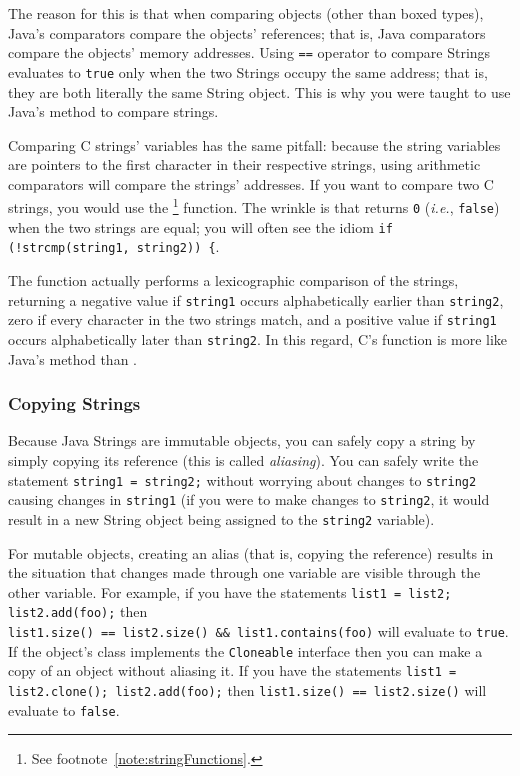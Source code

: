 The reason for this is that when comparing objects (other than boxed types), Java's comparators compare the objects' references;
that is, Java comparators compare the objects' memory addresses.
Using \lstinline{==} operator to compare Strings evaluates to \lstinline{true} only when the two Strings occupy the same address;
that is, they are both literally the same String object.
This is why you were taught to use Java's  method to compare strings.

Comparing C strings' variables has the same pitfall:
because the string variables are pointers to the first character in their respective strings, using arithmetic comparators will compare the strings' addresses.
If you want to compare two C strings, you would use the \footnote{See footnote~\ref{note:stringFunctions}.} function.
The wrinkle is that  returns \lstinline{0} (\textit{i.e.}, \lstinline{false}) when the two strings are equal;
you will often see the idiom \lstinline{if (!strcmp(string1, string2)) {}.

The  function actually performs a lexicographic comparison of the strings, returning a negative value if \lstinline{string1} occurs alphabetically earlier than \lstinline{string2}, zero if every character in the two strings match, and a positive value if \lstinline{string1} occurs alphabetically later than \lstinline{string2}.
In this regard, C's  function is more like Java's  method than .

\subsubsection{Copying Strings}

Because Java Strings are immutable objects, you can safely copy a string by simply copying its reference (this is called \textit{aliasing}).
You can safely write the statement \lstinline{string1 = string2;} without worrying about changes to \lstinline{string2} causing changes in \lstinline{string1}
(if you were to make changes to \lstinline{string2}, it would result in a new String object being assigned to the \lstinline{string2} variable).

For mutable objects, creating an alias (that is, copying the reference) results in the situation that changes made through one variable are visible through the other variable.
For example, if you have the statements \lstinline{list1 = list2; list2.add(foo);} then \\ \lstinline{list1.size() == list2.size() && list1.contains(foo)} will evaluate to \lstinline{true}.
If the object's class implements the \lstinline{Cloneable} interface then you can make a copy of an object without aliasing it.
If you have the statements \lstinline{list1 = list2.clone(); list2.add(foo);} then \lstinline{list1.size() == list2.size()} will evaluate to \lstinline{false}.

